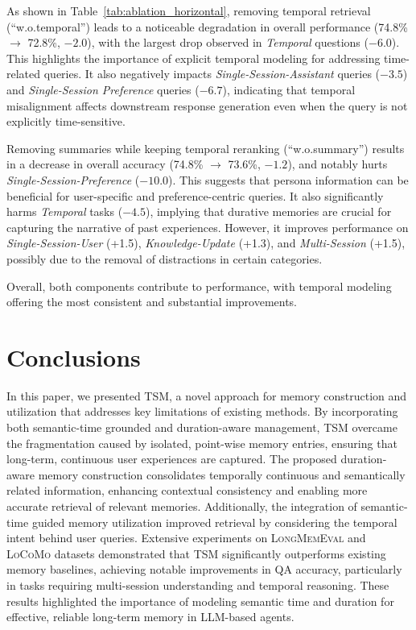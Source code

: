 \documentclass[11pt]{article}
\newcommand{\ours}[1]{TSM}
\begin{document}
As shown in Table~\ref{tab:ablation_horizontal}, removing temporal retrieval (``w.o.temporal'') leads to a noticeable degradation in overall performance (74.8\% $\rightarrow$ 72.8\%, $-2.0$), with the largest drop observed in \textit{Temporal} questions ($-6.0$). This highlights the importance of explicit temporal modeling for addressing time-related queries. It also negatively impacts \textit{Single-Session-Assistant} queries ($-3.5$) and \textit{Single-Session Preference} queries ($-6.7$), indicating that temporal misalignment affects downstream response generation even when the query is not explicitly time-sensitive.

Removing summaries while keeping temporal reranking (``w.o.summary'') results in a decrease in overall accuracy (74.8\% $\rightarrow$ 73.6\%, $-1.2$), and notably hurts \textit{Single-Session-Preference} ($-10.0$). This suggests that persona information can be beneficial for user-specific and preference-centric queries. 
It also significantly harms \textit{Temporal} tasks ($-4.5$), implying that durative memories are crucial for capturing the narrative of past experiences.
However, it improves performance on \textit{Single-Session-User} (+1.5), \textit{Knowledge-Update} (+1.3), and \textit{Multi-Session} (+1.5), possibly due to the removal of distractions in certain categories.

Overall, both components contribute to performance, with temporal modeling offering the most consistent and substantial improvements.



\section{Conclusions}

In this paper, we presented \ours{}, a novel approach for memory construction and utilization that addresses key limitations of existing methods. By incorporating both semantic-time grounded and duration-aware management, \ours{} overcame the fragmentation caused by isolated, point-wise memory entries, ensuring that long-term, continuous user experiences are captured. The proposed duration-aware memory construction consolidates temporally continuous and semantically related information, enhancing contextual consistency and enabling more accurate retrieval of relevant memories. Additionally, the integration of semantic-time guided memory utilization improved retrieval by considering the temporal intent behind user queries. Extensive experiments on \textsc{LongMemEval} and \textsc{LoCoMo} datasets demonstrated that \ours{} significantly outperforms existing memory baselines, achieving notable improvements in QA accuracy, particularly in tasks requiring multi-session understanding and temporal reasoning. These results highlighted the importance of modeling semantic time and duration for effective, reliable long-term memory in LLM-based agents.
\end{document}
